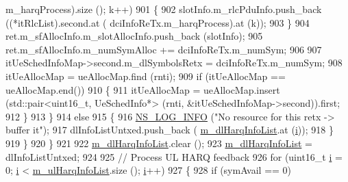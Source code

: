 \begin{DoxyCode}
      m\_harqProcess).size (); k++)
901                                         \{
902                                                 slotInfo.m\_rlcPduInfo.push\_back ((*itRlcList).second.at (
      dciInfoReTx.m\_harqProcess).at (k));
903                                         \}
904                                         ret.m\_sfAllocInfo.m\_slotAllocInfo.push\_back (slotInfo);
905                                         ret.m\_sfAllocInfo.m\_numSymAlloc += dciInfoReTx.m\_numSym;
906 
907                                         itUeSchedInfoMap->second.m\_dlSymbolsRetx = dciInfoReTx.m\_numSym;
908                                         itUeAllocMap = ueAllocMap.find (rnti);
909                                         \textcolor{keywordflow}{if} (itUeAllocMap == ueAllocMap.end())
910                                         \{
911                                                 itUeAllocMap = ueAllocMap.insert (std::pair<uint16\_t,
       UeSchedInfo*> (rnti, &itUeSchedInfoMap->second)).first;
912                                         \}
913                                 \}
914                                 \textcolor{keywordflow}{else}
915                                 \{
916                                         \hyperlink{group__logging_gafbd73ee2cf9f26b319f49086d8e860fb}{NS\_LOG\_INFO} (\textcolor{stringliteral}{"No resource for this retx -> buffer it"});
917                                         dlInfoListUntxed.push\_back (
      \hyperlink{classns3_1_1MmWaveFlexTtiPfMacScheduler_a71cf056c010c970921c28871ed145af0}{m\_dlHarqInfoList}.at (\hyperlink{bernuolliDistribution_8m_a6f6ccfcf58b31cb6412107d9d5281426}{i}));
918                                 \}
919                         \}
920                 \}
921 
922                 \hyperlink{classns3_1_1MmWaveFlexTtiPfMacScheduler_a71cf056c010c970921c28871ed145af0}{m\_dlHarqInfoList}.clear ();
923                 \hyperlink{classns3_1_1MmWaveFlexTtiPfMacScheduler_a71cf056c010c970921c28871ed145af0}{m\_dlHarqInfoList} = dlInfoListUntxed;
924 
925                 \textcolor{comment}{// Process UL HARQ feedback}
926                 \textcolor{keywordflow}{for} (uint16\_t \hyperlink{bernuolliDistribution_8m_a6f6ccfcf58b31cb6412107d9d5281426}{i} = 0; \hyperlink{bernuolliDistribution_8m_a6f6ccfcf58b31cb6412107d9d5281426}{i} < \hyperlink{classns3_1_1MmWaveFlexTtiPfMacScheduler_ad0251a6033c790a29ff25da7426ffd38}{m\_ulHarqInfoList}.size (); 
      \hyperlink{bernuolliDistribution_8m_a6f6ccfcf58b31cb6412107d9d5281426}{i}++)
927                 \{
928                         \textcolor{keywordflow}{if} (symAvail == 0)

\end{DoxyCode}
